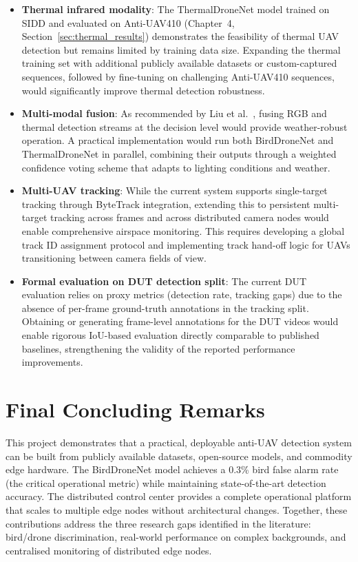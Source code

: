 \documentclass[12pt,a4paper]{report}
\begin{document}
\begin{itemize}
  \item \textbf{Thermal infrared modality}: The ThermalDroneNet model trained on SIDD and evaluated on Anti-UAV410 (Chapter~4, Section~\ref{sec:thermal_results}) demonstrates the feasibility of thermal UAV detection but remains limited by training data size. Expanding the thermal training set with additional publicly available datasets or custom-captured sequences, followed by fine-tuning on challenging Anti-UAV410 sequences, would significantly improve thermal detection robustness.
  
  \item \textbf{Multi-modal fusion}: As recommended by Liu et al.~\cite{liu2024survey}, fusing RGB and thermal detection streams at the decision level would provide weather-robust operation. A practical implementation would run both BirdDroneNet and ThermalDroneNet in parallel, combining their outputs through a weighted confidence voting scheme that adapts to lighting conditions and weather.
  
  \item \textbf{Multi-UAV tracking}: While the current system supports single-target tracking through ByteTrack integration, extending this to persistent multi-target tracking across frames and across distributed camera nodes would enable comprehensive airspace monitoring. This requires developing a global track ID assignment protocol and implementing track hand-off logic for UAVs transitioning between camera fields of view.
  
  \item \textbf{Formal evaluation on DUT detection split}: The current DUT evaluation relies on proxy metrics (detection rate, tracking gaps) due to the absence of per-frame ground-truth annotations in the tracking split. Obtaining or generating frame-level annotations for the DUT videos would enable rigorous IoU-based evaluation directly comparable to published baselines, strengthening the validity of the reported performance improvements.
\end{itemize}

\section{Final Concluding Remarks}

This project demonstrates that a practical, deployable anti-UAV detection
system can be built from publicly available datasets, open-source models,
and commodity edge hardware. The BirdDroneNet model achieves a 0.3\%
bird false alarm rate (the critical operational metric) while
maintaining state-of-the-art detection accuracy. The distributed control
center provides a complete operational platform that scales to multiple
edge nodes without architectural changes. Together, these contributions
address the three research gaps identified in the literature: bird/drone
discrimination, real-world performance on complex backgrounds, and
centralised monitoring of distributed edge nodes.
\end{document}
